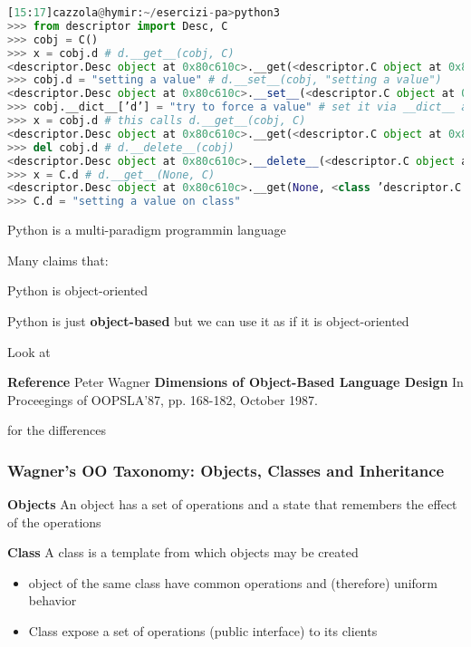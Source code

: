 \begin{lstlisting}[language=Python]
[15:17]cazzola@hymir:~/esercizi-pa>python3
>>> from descriptor import Desc, C
>>> cobj = C()
>>> x = cobj.d # d.__get__(cobj, C)
<descriptor.Desc object at 0x80c610c>.__get(<descriptor.C object at 0x80c3b0c>, <class ’descriptor.C’>)
>>> cobj.d = "setting a value" # d.__set__(cobj, "setting a value")
<descriptor.Desc object at 0x80c610c>.__set__(<descriptor.C object at 0x80c3b0c>, setting a value)
>>> cobj.__dict__[’d’] = "try to force a value" # set it via __dict__ avoiding the descriptor
>>> x = cobj.d # this calls d.__get__(cobj, C)
<descriptor.Desc object at 0x80c610c>.__get(<descriptor.C object at 0x80c3b0c>, <class ’descriptor.C’>)
>>> del cobj.d # d.__delete__(cobj)
<descriptor.Desc object at 0x80c610c>.__delete__(<descriptor.C object at 0x80c3b0c>)
>>> x = C.d # d.__get__(None, C)
<descriptor.Desc object at 0x80c610c>.__get(None, <class ’descriptor.C’>)
>>> C.d = "setting a value on class" 
\end{lstlisting}








Python is a multi-paradigm programmin language

Many claims that:

\begin{center}
Python is object-oriented
\end{center}

Python is just \textbf{object-based} but we can use it as if it is object-oriented

Look at

\begin{center}
\textbf{Reference}
Peter Wagner
\textbf{Dimensions of Object-Based Language Design}
In Proceegings of OOPSLA'87, pp. 168-182, October 1987.
\end{center}

for the differences

\subsubsection{Wagner’s OO Taxonomy: Objects, Classes and Inheritance}

\textbf{Objects}
An object has a set of operations and a state that remembers the effect of the operations

\textbf{Class}
A class is a template from which objects may be created

\begin{itemize}
	\item object of the same class have common operations and (therefore) uniform behavior
	\item Class expose a set of operations (public interface) to its clients
\end{itemize}

